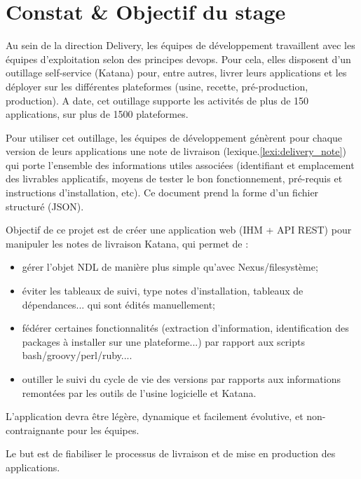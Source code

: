\section{Constat \& Objectif du stage}
Au sein de la direction Delivery, les équipes de développement travaillent avec les équipes d’exploitation selon des principes devops.
Pour cela, elles disposent d’un outillage self-service (Katana) pour, entre autres,
livrer leurs applications et les déployer sur les différentes plateformes (usine, recette, pré-production, production).
A date, cet outillage supporte les activités de plus de 150 applications, sur plus de 1500 plateformes.

Pour utiliser cet outillage,
les équipes de développement génèrent pour chaque version de leurs applications une note de livraison (lexique.\ref{lexi:delivery_note}) qui porte l’ensemble des informations utiles associées
(identifiant et emplacement des livrables applicatifs, moyens de tester le bon fonctionnement, pré-requis et instructions d’installation, etc).
Ce document prend la forme d’un fichier structuré (JSON).

Objectif de ce projet est de créer une application web (IHM + API REST) pour manipuler les notes de livraison Katana, qui permet de :

\begin{itemize}
 \item gérer l'objet NDL de manière plus simple qu'avec Nexus/filesystème;
 \item éviter les tableaux de suivi, type notes d'installation, tableaux de dépendances... qui sont édités manuellement;
 \item fédérer certaines fonctionnalités (extraction d'information, identification des packages à installer sur une plateforme...) par rapport aux scripts bash/groovy/perl/ruby....
 \item outiller le suivi du cycle de vie des versions par rapports aux informations remontées par les outils de l'usine logicielle et Katana.
\end{itemize}

L’application devra être légère, dynamique et facilement évolutive, et non-contraignante pour les équipes.

Le but est de fiabiliser le processus de livraison et de mise en production des applications.

